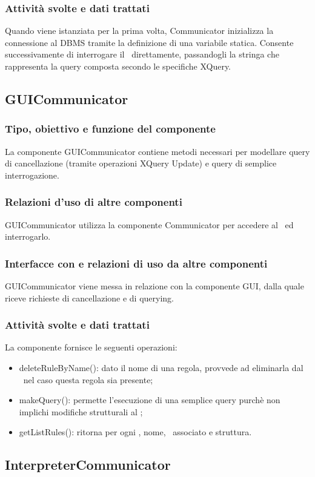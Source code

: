 \subsubsection{Attivit\`a svolte e dati trattati}
Quando viene istanziata per la prima volta, Communicator inizializza la connessione al DBMS tramite la definizione di una variabile statica. Consente successivamente di interrogare il \rp\ direttamente, passandogli la stringa che rappresenta la query composta secondo le specifiche XQuery.
%
\subsection{GUICommunicator}
\subsubsection{Tipo, obiettivo e funzione del componente}
La componente GUICommunicator contiene metodi necessari per modellare query di cancellazione (tramite operazioni XQuery Update) e query di semplice interrogazione.
\subsubsection{Relazioni d'uso di altre componenti}
GUICommunicator utilizza la componente Communicator per accedere al \rp\ ed interrogarlo.
\subsubsection{Interfacce con e relazioni di uso da altre componenti}
GUICommunicator viene messa in relazione con la componente GUI, dalla quale riceve richieste di cancellazione e di querying.
\subsubsection{Attivit\`a svolte e dati trattati}
La componente fornisce le seguenti operazioni:
\begin{itemize}
 \item deleteRuleByName(): dato il nome di una regola, provvede ad eliminarla dal \rp\ nel caso questa regola sia presente;
 \item makeQuery(): permette l'esecuzione di una semplice query purch\`e non implichi modifiche strutturali al \rp;
 \item getListRules(): ritorna per ogni \br, nome, \bo\ associato e struttura.
\end{itemize}
\subsection{InterpreterCommunicator}
